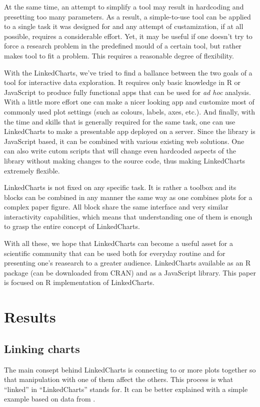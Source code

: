 \documentclass[twocolumn,10pt]{article}
\begin{document}
At the same time, an attempt to simplify a tool may result in hardcoding and presetting too many parameters. As a result, a simple-to-use tool can be applied to a single task it was designed for and any attempt of custamization, if at all possible, requires a considerable effort. Yet, it may be useful if one doesn't try to force a research problem in the predefined mould of a certain tool, but rather makes tool to fit a problem. This requires a reasonable degree of flexibility.

With the LinkedCharts, we've tried to find a ballance between the two goals of a tool for interactive data exploration. It requires only basic knowledge in R or JavaScript to produce fully functional apps that can be used for \emph{ad hoc} analysis. With a little more effort one can make a nicer looking app and customize most of commonly used plot settings (such as colours, labels, axes, etc.). And finally, with the time and skills that is generally required for the same task, one can use LinkedCharts to make a presentable app deployed on a server. Since the library is JavaScript based, it can be combined with various existing web solutions. One can also write cutom scripts that will change even hardcoded aspects of the library without making changes to the source code, thus making LinkedCharts extremely flexible. 

LinkedCharts is not fixed on any specific task. It is rather a toolbox and its blocks can be combined in any manner the same way as one combines plots for a complex paper figure. All block share the same interface and very similar interactivity capabilities, which means that understanding one of them is enough to grasp the entire concept of LinkedCharts.

With all these, we hope that LinkedCharts can become a useful asset for a scientific community that can be used both for everyday routine and for presenting one's reasearch to a greater audience. LinkedCharts available as an R package (can be downloaded from CRAN) and as a JavaScript library. This paper is focused on R implementation of LinkedCharts. 

\section{Results}
\subsection{Linking charts}

The main consept behind LinkedCharts is connecting to or more plots together so that manipulation with one of them affect the others. This process is what ``linked'' in ``LinkedCharts'' stands for. It can be better explained with a simple example based on data from \citet{conway_2015}.
\end{document}
